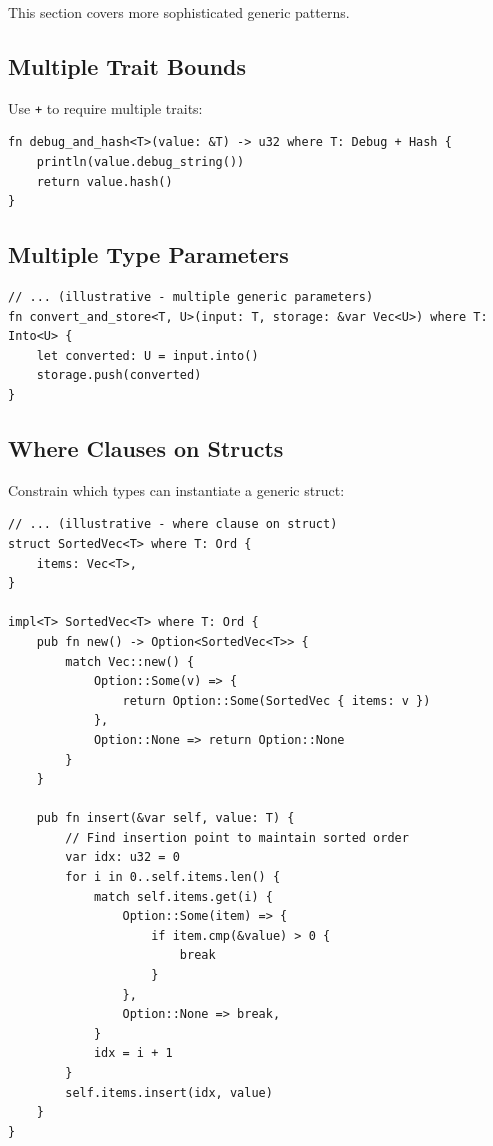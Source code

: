 This section covers more sophisticated generic patterns.

\subsection{Multiple Trait Bounds}

Use \texttt{+} to require multiple traits:

\begin{lstlisting}
fn debug_and_hash<T>(value: &T) -> u32 where T: Debug + Hash {
    println(value.debug_string())
    return value.hash()
}
\end{lstlisting}

\subsection{Multiple Type Parameters}

\begin{lstlisting}
// ... (illustrative - multiple generic parameters)
fn convert_and_store<T, U>(input: T, storage: &var Vec<U>) where T: Into<U> {
    let converted: U = input.into()
    storage.push(converted)
}
\end{lstlisting}

\subsection{Where Clauses on Structs}

Constrain which types can instantiate a generic struct:

\begin{lstlisting}
// ... (illustrative - where clause on struct)
struct SortedVec<T> where T: Ord {
    items: Vec<T>,
}

impl<T> SortedVec<T> where T: Ord {
    pub fn new() -> Option<SortedVec<T>> {
        match Vec::new() {
            Option::Some(v) => {
                return Option::Some(SortedVec { items: v })
            },
            Option::None => return Option::None
        }
    }

    pub fn insert(&var self, value: T) {
        // Find insertion point to maintain sorted order
        var idx: u32 = 0
        for i in 0..self.items.len() {
            match self.items.get(i) {
                Option::Some(item) => {
                    if item.cmp(&value) > 0 {
                        break
                    }
                },
                Option::None => break,
            }
            idx = i + 1
        }
        self.items.insert(idx, value)
    }
}
\end{lstlisting}

